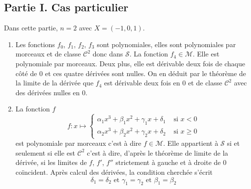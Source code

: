 \subsection*{Partie I. Cas particulier}
Dans cette partie, $n=2$ avec $X = (-1, 0, 1)$.
\begin{enumerate}
  \item Les fonctions $f_0$, $f_1$, $f_2$, $f_3$ sont polynomiales, elles sont polynomiales par morceaux et de classe $\mathcal{C}^2$ donc dans $\mathcal{S}$.\newline
  La fonction $f_4\in \mathcal{M}$. Elle est polynomiale par morceaux. Deux plus, elle est dérivable deux fois de chaque côté de $0$ et ces quatre dérivées sont nulles. On en déduit par le théorème de la limite de la dérivée que $f_4$ est dérivable deux fois en $0$ et de classe $\mathcal{C}^2$ avec des dérivées nulles en $0$.
  
  \item La fonction $f$
\begin{displaymath}
f : x \mapsto \left\{ \begin{array}{ll} \alpha_1 x^3 + \beta_1 x^2 + \gamma_1 x + \delta_1 & \text{ si } x < 0 \\ \alpha_2 x^3 + \beta_2 x^2 + \gamma_2 x + \delta_2 & \text{ si } x \geqslant 0  \end{array} \right.  
\end{displaymath}
est polynomiale par morceaux c'est à dire $f\in \mathcal{M}$. Elle appartient à $\mathcal{S}$ si et seulement si elle est $\mathcal{C}^2$ c'est à dire, d'après le théorème de limite de la dérivée, si les limites de $f$, $f'$, $f''$ strictement à gauche et à droite de $0$ coïncident. Après calcul des dérivées, la condition cherchée s'écrit
\begin{displaymath}
\delta_1 = \delta_2 \text{ et } \gamma_1 = \gamma_2 \text{ et }\beta_1 = \beta_2
\end{displaymath}
  

\end{enumerate}
